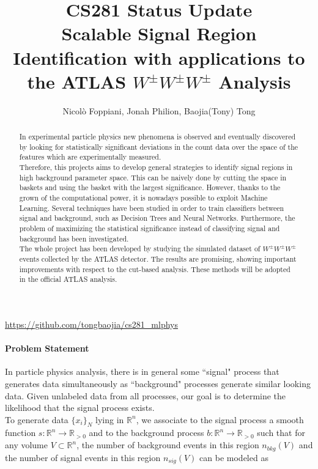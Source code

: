 \documentclass[11pt]{article}
\title{CS281 Status Update \\
	\large Scalable Signal Region Identification with applications to the ATLAS $W^\pm W^\pm W^\pm$ Analysis}
\author{Nicol\`o Foppiani, Jonah Philion, Baojia(Tony) Tong}
\date{}
\begin{document}
\maketitle

\centering
\href{https://github.com/tongbaojia/cs281_mlphys}{https://github.com/tongbaojia/cs281\_mlphys}

\renewcommand{\abstractname}{Draft of the final abstract}
\begin{abstract}
In experimental particle physics new phenomena is observed and eventually discovered by looking for statistically significant deviations in the count data over the space of the features which are experimentally measured.\\
Therefore, this projects aims to develop general strategies to identify signal regions in high background parameter space. This can be naively done by cutting the space in baskets and using the basket with the largest significance. However, thanks to the grown of the computational power, it is nowadays possible to exploit Machine Learning. Several techniques have been studied in order to train classifiers between signal and background, such as Decision Trees and Neural Networks. Furthermore, the problem of maximizing the statistical significance instead of classifying signal and background has been investigated.\\
The whole project has been developed by studying the simulated dataset of $W^\pm W^\pm W^\pm$ events collected by the ATLAS detector. The results are promising, showing important improvements with respect to the cut-based analysis. These methods will be adopted in the official ATLAS analysis.
\end{abstract}

\paragraph{Problem Statement}
In particle physics analysis, there is in general some ``signal" process that generates data simultaneously as ``background" processes generate similar looking data. Given unlabeled data from all processes, our goal is to determine the likelihood that the signal process exists.\\
To generate data $\{x_i\}_N$ lying in $\mathbb{R}^n$, we associate to the signal process a smooth function $s: \mathbb{R}^n \rightarrow \mathbb{R}_{> 0}$ and to the background process $b: \mathbb{R}^n \rightarrow \mathbb{R}_{> 0}$ such that for any volume $V \subset \mathbb{R}^n$, the number of background events in this region $n_{bkg}(V)$ and the number of signal events in this region $n_{sig}(V)$ can  be modeled as 
\end{document}
